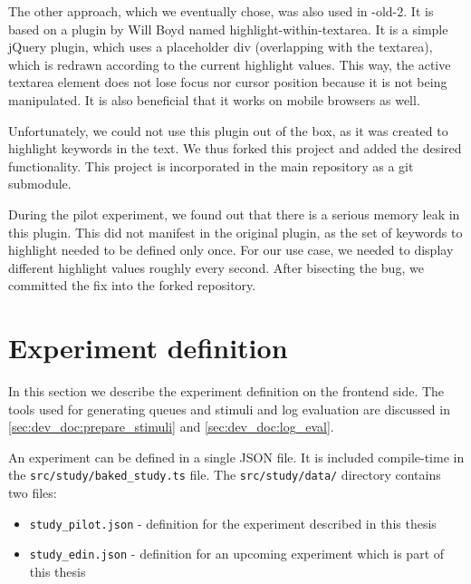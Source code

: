 The other approach, which we eventually chose, was also used in \ptakopet{}-old-2. It is based on a plugin by Will Boyd named highlight-within-textarea. It is a simple jQuery plugin, which uses a placeholder div (overlapping with the textarea), which is redrawn according to the current highlight values. This way, the active textarea element does not lose focus nor cursor position because it is not being manipulated. It is also beneficial that it works on mobile browsers as well.

Unfortunately, we could not use this plugin out of the box, as it was created to highlight keywords in the text. We thus forked this project and added the desired functionality. This project is incorporated in the main \ptakopet{} repository as a git submodule.

During the pilot experiment, we found out that there is a serious memory leak in this plugin. This did not manifest in the original plugin, as the set of keywords to highlight needed to be defined only once. For our use case, we needed to display different highlight values roughly every second. After bisecting the bug, we committed the fix into the forked repository.

\pagebreak
\section{Experiment definition} \label{sec:dev_doc:experiment_def}

In this section we describe the experiment definition on the frontend side. The tools used for generating queues and stimuli and log evaluation are discussed in \cref{sec:dev_doc:prepare_stimuli} and \cref{sec:dev_doc:log_eval}.

An experiment can be defined in a single JSON file. It is included compile-time in the \texttt{src/study/baked\_study.ts} file. The \texttt{src/study/data/} directory contains two files:
\begin{itemize}
    \item \texttt{study\_pilot.json} - definition for the experiment described in this thesis
    \item \texttt{study\_edin.json} - definition for an upcoming experiment which is part of this thesis
\end{itemize}

